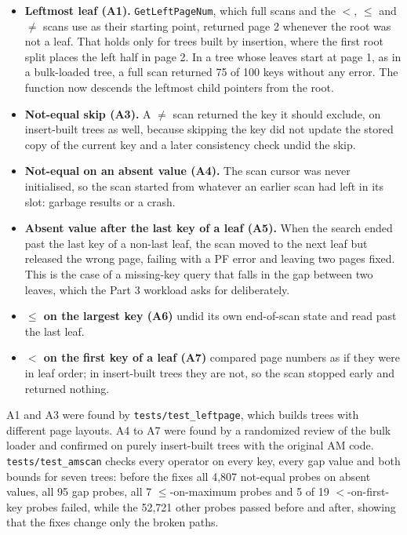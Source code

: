 \documentclass[11pt,a4paper]{article}
\begin{document}
\begin{itemize}
\item \textbf{Leftmost leaf (A1).} \texttt{GetLeftPageNum}, which full scans and the \(<\), \(\le\) and \(\ne\) scans use as their starting point, returned page 2 whenever the root was not a leaf. That holds only for trees built by insertion, where the first root split places the left half in page 2. In a tree whose leaves start at page 1, as in a bulk-loaded tree, a full scan returned 75 of 100 keys without any error. The function now descends the leftmost child pointers from the root.
\item \textbf{Not-equal skip (A3).} A \(\ne\) scan returned the key it should exclude, on insert-built trees as well, because skipping the key did not update the stored copy of the current key and a later consistency check undid the skip.
\item \textbf{Not-equal on an absent value (A4).} The scan cursor was never initialised, so the scan started from whatever an earlier scan had left in its slot: garbage results or a crash.
\item \textbf{Absent value after the last key of a leaf (A5).} When the search ended past the last key of a non-last leaf, the scan moved to the next leaf but released the wrong page, failing with a PF error and leaving two pages fixed. This is the case of a missing-key query that falls in the gap between two leaves, which the Part 3 workload asks for deliberately.
\item \textbf{\(\le\) on the largest key (A6)} undid its own end-of-scan state and read past the last leaf.
\item \textbf{\(<\) on the first key of a leaf (A7)} compared page numbers as if they were in leaf order; in insert-built trees they are not, so the scan stopped early and returned nothing.
\end{itemize}

A1 and A3 were found by \texttt{tests/test\_leftpage}, which builds trees with different page layouts. A4 to A7 were found by a randomized review of the bulk loader and confirmed on purely insert-built trees with the original AM code. \texttt{tests/test\_amscan} checks every operator on every key, every gap value and both bounds for seven trees: before the fixes all 4{,}807 not-equal probes on absent values, all 95 gap probes, all 7 \(\le\)-on-maximum probes and 5 of 19 \(<\)-on-first-key probes failed, while the 52{,}721 other probes passed before and after, showing that the fixes change only the broken paths.
\end{document}
